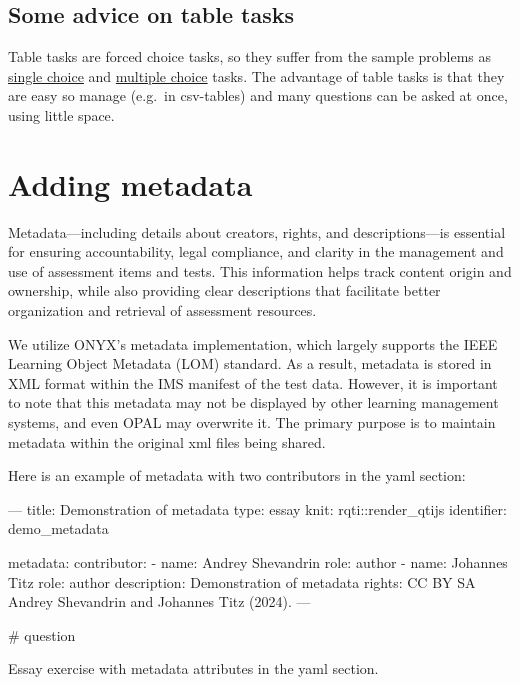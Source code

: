 \documentclass[twoside]{tufte-book}
\newenvironment{Shaded}{}{}
\begin{document}
\section{Some advice on table tasks}\label{some-advice-on-table-tasks}

Table tasks are forced choice tasks, so they suffer from the sample problems as \href{singlechoice.html}{single choice} and \href{multiplechoice.html}{multiple choice} tasks. The advantage of table tasks is that they are easy so manage (e.g.~in csv-tables) and many questions can be asked at once, using little space.

\chapter{Adding metadata}\label{adding-metadata}

Metadata---including details about creators, rights, and descriptions---is essential for ensuring accountability, legal compliance, and clarity in the management and use of assessment items and tests. This information helps track content origin and ownership, while also providing clear descriptions that facilitate better organization and retrieval of assessment resources.

We utilize ONYX's metadata implementation, which largely supports the IEEE Learning Object Metadata (LOM) standard. As a result, metadata is stored in XML format within the IMS manifest of the test data. However, it is important to note that this metadata may not be displayed by other learning management systems, and even OPAL may overwrite it. The primary purpose is to maintain metadata within the original xml files being shared.

Here is an example of metadata with two contributors in the yaml section:

\begin{Shaded}
\begin{Highlighting}
---
title: Demonstration of metadata
type: essay
knit: rqti::render_qtijs
identifier: demo_metadata

metadata:
  contributor:
    - name: Andrey Shevandrin
      role: author
    - name: Johannes Titz 
      role: author
  description: Demonstration of metadata
  rights: CC BY SA Andrey Shevandrin and Johannes Titz (2024).
---

# question

Essay exercise with metadata attributes in the yaml section.
\end{Highlighting}
\end{Shaded}
\end{document}
